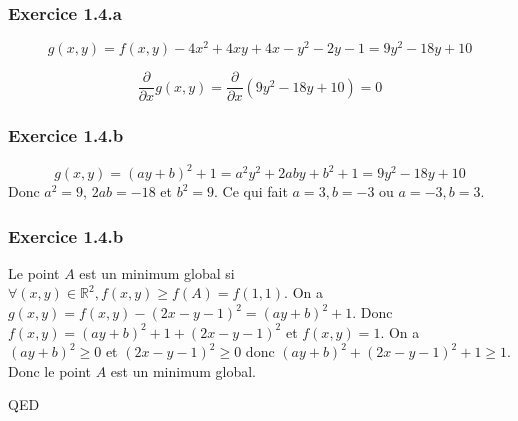 \documentclass[]{book}
\theoremstyle{definition}
\newcommand{\bb}[1]{\mathbb{#1}}
\newcommand{\R}{\bb{R}}
\begin{document}
\subsubsection*{Exercice 1.4.a}
$$
g(x,y) = f(x,y) - 4x^2 + 4xy +4x -y^2 -2y -1 = 9y^2 -18y +10 
$$

$$
\frac{\partial }{\partial x}g(x,y) = \frac{\partial }{\partial x}(9y^2 -18y +10) = 0
$$

\subsubsection*{Exercice 1.4.b}
$$
g(x,y) = (ay+b)^2 + 1 = a^2y^2+2aby+b^2+1 = 9y^2-18y+10
$$
Donc $a^2=9$, $2ab = -18$  et $b^2=9$. Ce qui fait $a=3,b=-3$ ou $a=-3,b=3$.

\subsubsection*{Exercice 1.4.b}
Le point $A$ est un minimum global si $\forall (x,y) \in \R^2, f(x,y) \ge f(A) = f(1,1)$.	On a $g(x,y) = f(x,y) - (2x-y-1)^2 = (ay+b)^2+1$. Donc $f(x,y) = (ay+b)^2+1 + (2x-y-1)^2$ et $f(x,y) = 1$. On a $(ay+b)^2 \ge 0$ et $(2x-y-1)^2 \ge 0$ donc $(ay+b)^2 + (2x-y-1)^2 +1 \ge 1$. Donc le point $A$ est un minimum global.




QED
\end{document}
